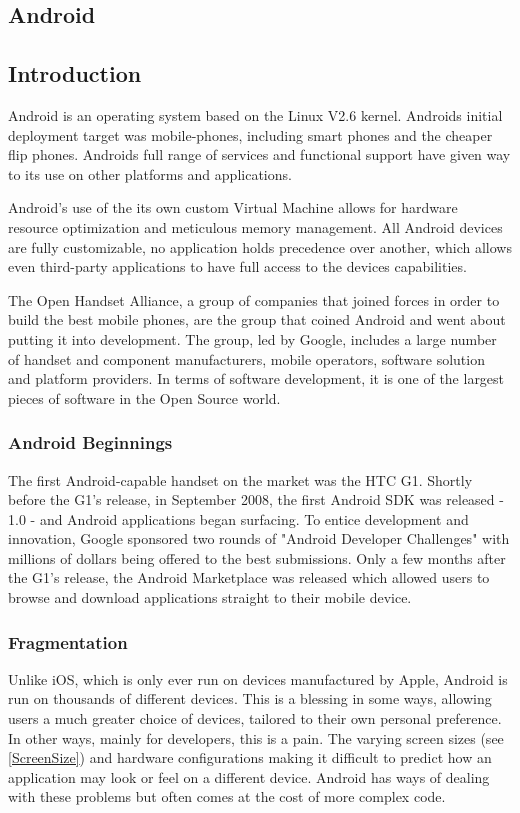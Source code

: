 \documentclass{l4proj}
\begin{document}
\begin{appendices}

\chapter{Android}

\section{Introduction}

Android is an operating system based on the Linux V2.6 kernel. Androids initial deployment target was mobile-phones, including smart phones and the cheaper flip phones. Androids full range of services and functional support have given way to its use on other platforms and applications.  

Android's use of the its own custom Virtual Machine allows for hardware resource optimization and meticulous memory management.  All Android devices are fully customizable, no application holds precedence over another, which allows even third-party applications to have full access to the devices capabilities.  

The Open Handset Alliance, a group of companies that joined forces in order to build the best mobile phones, are the group that coined Android and went about putting it into development.  The group, led by Google, includes a large number of handset and component manufacturers, mobile operators, software solution and platform providers. In terms of software development, it is one of the largest pieces of software in the Open Source world.

\subsection{Android Beginnings}
The first Android-capable handset on the market was the HTC G1. Shortly before the G1's release, in September 2008,  the first Android SDK was released - 1.0 - and Android applications began surfacing.
To entice development and innovation, Google sponsored two rounds of "Android Developer Challenges" with millions of dollars being offered to the best submissions. Only a few months after the G1's release, the Android Marketplace was released which allowed users to browse and download applications straight to their mobile device.

\subsection{Fragmentation}
Unlike iOS, which is only ever run on devices manufactured by Apple, Android is run on thousands of different devices. This is a blessing in some ways, allowing users a much greater choice of devices, tailored to their own personal preference. In other ways, mainly for developers, this is a pain.  The varying screen sizes (see \ref{ScreenSize}) and hardware configurations making it difficult to predict how an application may look or feel on a different device. Android has ways of dealing with these problems but often comes at the cost of more complex code.


\end{appendices}
\end{document}
